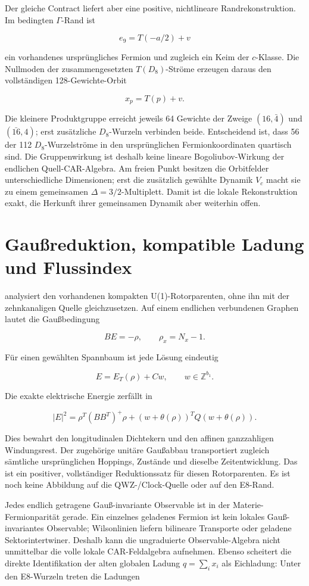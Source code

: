 Der gleiche Contract liefert aber eine positive, nichtlineare Randrekonstruktion. Im bedingten \(\Gamma\)-Rand ist

\[
e_9=T(-a/2)+v
\]

ein vorhandenes ursprüngliches Fermion und zugleich ein Keim der \(c\)-Klasse. Die Nullmoden der zusammengesetzten \(T(D_8)\)-Ströme erzeugen daraus den vollständigen 128-Gewichte-Orbit

\[
x_p=T(p)+v.
\]

Die kleinere Produktgruppe erreicht jeweils 64 Gewichte der Zweige \((16,\bar4)\) und \((\bar{16},4)\); erst zusätzliche \(D_8\)-Wurzeln verbinden beide. Entscheidend ist, dass 56 der 112 \(D_8\)-Wurzelströme in den ursprünglichen Fermionkoordinaten quartisch sind. Die Gruppenwirkung ist deshalb keine lineare Bogoliubov-Wirkung der endlichen Quell-CAR-Algebra. Am freien Punkt besitzen die Orbitfelder unterschiedliche Dimensionen; erst die zusätzlich gewählte Dynamik \(V_c\) macht sie zu einem gemeinsamen \(\Delta=3/2\)-Multiplett. Damit ist die lokale Rekonstruktion exakt, die Herkunft ihrer gemeinsamen Dynamik aber weiterhin offen.

\section{Gaußreduktion, kompatible Ladung und Flussindex}

 analysiert den vorhandenen kompakten U(1)-Rotorparenten, ohne ihn mit der zehnkanaligen Quelle gleichzusetzen. Auf einem endlichen verbundenen Graphen lautet die Gaußbedingung

\[
BE=-\rho,\qquad \rho_x=N_x-1.
\]

Für einen gewählten Spannbaum ist jede Lösung eindeutig

\[
E=E_T(\rho)+Cw,\qquad w\in\mathbb Z^{b_1}.
\]

Die exakte elektrische Energie zerfällt in

\[
|E|^2=\rho^T(BB^T)^+\rho+(w+\theta(\rho))^TQ(w+\theta(\rho)).
\]

Dies bewahrt den longitudinalen Dichtekern und den affinen ganzzahligen Windungsrest. Der zugehörige unitäre Gaußabbau transportiert zugleich sämtliche ursprünglichen Hoppings, Zustände und dieselbe Zeitentwicklung. Das ist ein positiver, vollständiger Reduktionssatz für diesen Rotorparenten. Es ist noch keine Abbildung auf die QWZ-/Clock-Quelle oder auf den E8-Rand.

Jedes endlich getragene Gauß-invariante Observable ist in der Materie-Fermionparität gerade. Ein einzelnes geladenes Fermion ist kein lokales Gauß-invariantes Observable; Wilsonlinien liefern bilineare Transporte oder geladene Sektorintertwiner. Deshalb kann die ungraduierte Observable-Algebra nicht unmittelbar die volle lokale CAR-Feldalgebra aufnehmen. Ebenso scheitert die direkte Identifikation der alten globalen Ladung \(q=\sum_i x_i\) als Eichladung: Unter den E8-Wurzeln treten die Ladungen


